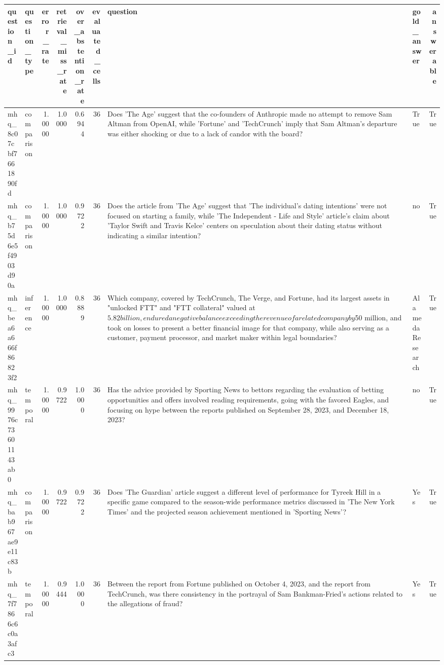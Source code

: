\begin{tabular}{llrrrrllr}
\toprule
question_id & question_type & error_rate & retrieval_miss_rate & over_abstention_rate & evaluated_cells & question & gold_answer & answerable \\
\midrule
mhq_8c07cbf7661890fd & comparison & 1.0000 & 1.0000 & 0.6944 & 36 & Does 'The Age' suggest that the co-founders of Anthropic made no attempt to remove Sam Altman from OpenAI, while 'Fortune' and 'TechCrunch' imply that Sam Altman's departure was either shocking or due to a lack of candor with the board? & True & True \\
mhq_b75d6e5f4903d90a & comparison & 1.0000 & 1.0000 & 0.9722 & 36 & Does the article from 'The Age' suggest that 'The individual's dating intentions' were not focused on starting a family, while 'The Independent - Life and Style' article's claim about 'Taylor Swift and Travis Kelce' centers on speculation about their dating status without indicating a similar intention? & no & True \\
mhq_bea6a666f86823f2 & inference & 1.0000 & 1.0000 & 0.8889 & 36 & Which company, covered by TechCrunch, The Verge, and Fortune, had its largest assets in "unlocked FTT" and "FTT collateral" valued at $5.82 billion, endured a negative balance exceeding the revenue of a related company by $50 million, and took on losses to present a better financial image for that company, while also serving as a customer, payment processor, and market maker within legal boundaries? & Alameda Research & True \\
mhq_9976c73601143ab0 & temporal & 1.0000 & 0.9722 & 1.0000 & 36 & Has the advice provided by Sporting News to bettors regarding the evaluation of betting opportunities and offers involved reading requirements, going with the favored Eagles, and focusing on hype between the reports published on September 28, 2023, and December 18, 2023? & no & True \\
mhq_bab967ae9e11c83b & comparison & 1.0000 & 0.9722 & 0.9722 & 36 & Does 'The Guardian' article suggest a different level of performance for Tyreek Hill in a specific game compared to the season-wide performance metrics discussed in 'The New York Times' and the projected season achievement mentioned in 'Sporting News'? & Yes & True \\
mhq_7f7866c6c0a3afc3 & temporal & 1.0000 & 0.9444 & 1.0000 & 36 & Between the report from Fortune published on October 4, 2023, and the report from TechCrunch, was there consistency in the portrayal of Sam Bankman-Fried's actions related to the allegations of fraud? & Yes & True \\

\end{tabular}

